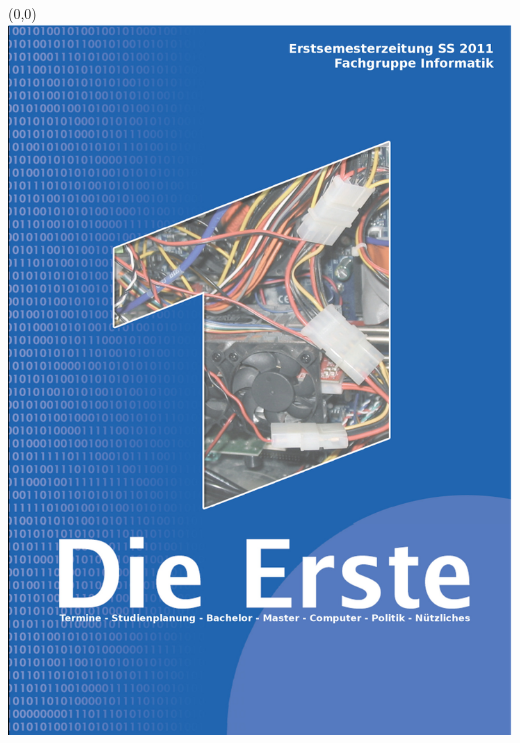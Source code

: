 \begin{titlepage}
\ifpdf
\begin{textblock}{3}(0,0)
\includegraphics[width=\paperwidth]{bilder/titelseite.pdf}
\end{textblock}
\leavevmode\newpage 
%
\else

\end{titlepage}
